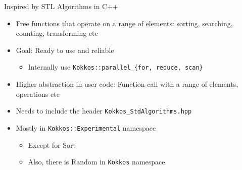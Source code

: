 \documentclass[
    aspectratio=169,
    \createHandout
]{beamer}
\begin{document}
\begin{frame}[fragile]{Inspired by STL Algorithms in C++}
    \begin{itemize}
        \item Free functions that operate on a range of elements:
        sorting, searching, counting, transforming etc
        \item Goal: Ready to use and reliable
        \begin{itemize}
            \item Internally use \texttt{Kokkos::parallel\_\{for, reduce, scan\}}
        \end{itemize}
        \item Higher abstraction in user code: Function call with a range of elements, operations etc
        \item Needs to include the header \texttt{Kokkos\_StdAlgorithms.hpp}
        \item Mostly in \texttt{Kokkos::Experimental} namespace
        \begin{itemize}
            \item Except for Sort
            \item Also, there is Random in \texttt{Kokkos} namespace
        \end{itemize}
    \end{itemize}
\end{frame}
\end{document}
